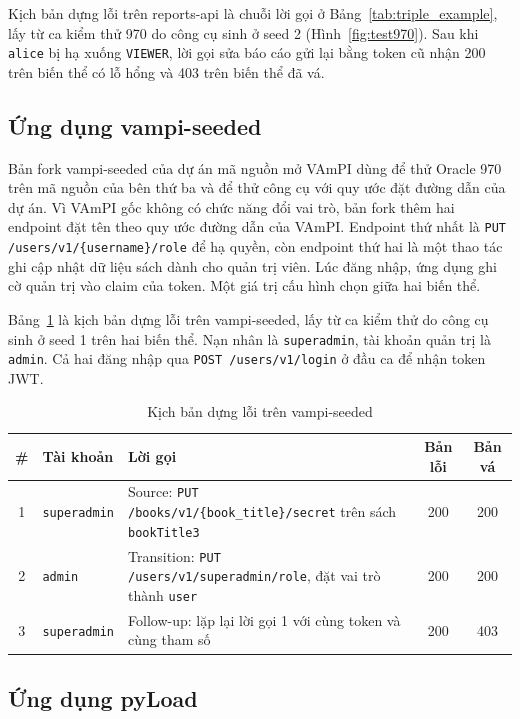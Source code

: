 Kịch bản dựng lỗi trên reports-api là chuỗi lời gọi ở Bảng~\ref{tab:triple_example}, lấy từ ca kiểm thử 970 do công cụ sinh ở seed 2 (Hình~\ref{fig:test970}). Sau khi \texttt{alice} bị hạ xuống \texttt{VIEWER}, lời gọi sửa báo cáo gửi lại bằng token cũ nhận 200 trên biến thể có lỗ hổng và 403 trên biến thể đã vá.

\subsection{Ứng dụng vampi-seeded}
\label{subsec:impl_vampi}

Bản fork vampi-seeded của dự án mã nguồn mở VAmPI dùng để thử Oracle 970 trên mã nguồn của bên thứ ba và để thử công cụ với quy ước đặt đường dẫn của dự án. Vì VAmPI gốc không có chức năng đổi vai trò, bản fork thêm hai endpoint đặt tên theo quy ước đường dẫn của VAmPI. Endpoint thứ nhất là \texttt{PUT /users/v1/\{username\}/role} để hạ quyền, còn endpoint thứ hai là một thao tác ghi cập nhật dữ liệu sách dành cho quản trị viên. Lúc đăng nhập, ứng dụng ghi cờ quản trị vào claim của token. Một giá trị cấu hình chọn giữa hai biến thể.

Bảng~\ref{tab:scenario_vampi} là kịch bản dựng lỗi trên vampi-seeded, lấy từ ca kiểm thử do công cụ sinh ở seed 1 trên hai biến thể. Nạn nhân là \texttt{superadmin}, tài khoản quản trị là \texttt{admin}. Cả hai đăng nhập qua \texttt{POST /users/v1/login} ở đầu ca để nhận token JWT.

\begin{table}[H]
  \centering
  \caption{Kịch bản dựng lỗi trên vampi-seeded}
  \label{tab:scenario_vampi}
  \begin{tabularx}{\textwidth}{@{}c l >{\raggedright\arraybackslash}X c c@{}}
    \toprule
    \# & Tài khoản & Lời gọi & Bản lỗi & Bản vá \\
    \midrule
    1 & \texttt{superadmin} & Source: \texttt{PUT /books/v1/\{book\_title\}/secret} trên sách \texttt{bookTitle3} & 200 & 200 \\
    2 & \texttt{admin} & Transition: \texttt{PUT /users/v1/superadmin/role}, đặt vai trò thành \texttt{user} & 200 & 200 \\
    3 & \texttt{superadmin} & Follow-up: lặp lại lời gọi 1 với cùng token và cùng tham số & 200 & 403 \\
    \bottomrule
  \end{tabularx}
\end{table}

\subsection{Ứng dụng pyLoad}
\label{subsec:impl_pyload}

